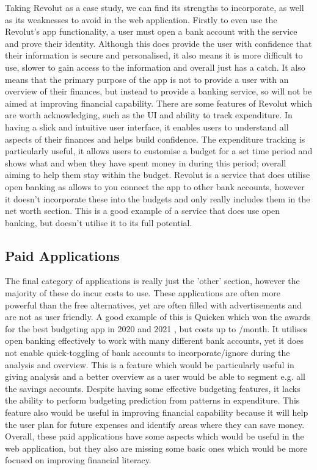 Taking Revolut \cite{RevolutWebsite} as a case study, we can find its strengths to incorporate, as well as its weaknesses to avoid in the web application. Firstly to even use the Revolut's app functionality, a user must open a bank account with the service and prove their identity. Although this does provide the user with confidence that their information is secure and personalised, it also means it is more difficult to use, slower to gain access to the information and overall just has a catch. It also means that the primary purpose of the app is not to provide a user with an overview of their finances, but instead to provide a banking service, so will not be aimed at improving financial capability. There are some features of Revolut which are worth acknowledging, such as the UI and ability to track expenditure. In having a slick and intuitive user interface, it enables users to understand all aspects of their finances and helps build confidence. The expenditure tracking is particularly useful, it allows users to customise a budget for a set time period and shows what and when they have spent money in during this period; overall aiming to help them stay within the budget. Revolut is a service that does utilise open banking as allows to you connect the app to other bank accounts, however it doesn't incorporate these into the budgets and only really includes them in the net worth section. This is a good example of a service that does use open banking, but doesn't utilise it to its full potential.

\subsection{Paid Applications}
\label{sec:paid-applications}
The final category of applications is really just the 'other' section, however the majority of these do incur costs to use. These applications are often more powerful than the free alternatives, yet are often filled with advertisements and are not as user friendly. A good example of this is Quicken which won the awards for the best budgeting app in 2020 and 2021 \cite{Quicken}, but costs up to /month. It utilises open banking effectively to work with many different bank accounts, yet it does not enable quick-toggling of bank accounts to incorporate/ignore during the analysis and overview. This is a feature which would be particularly useful in giving analysis and a better overview as a user would be able to segment e.g. all the savings accounts. Despite having some effective budgeting features, it lacks the ability to perform budgeting prediction from patterns in expenditure. This feature also would be useful in improving financial capability because it will help the user plan for future expenses and identify areas where they can save money. Overall, these paid applications have some aspects which would be useful in the web application, but they also are missing some basic ones which would be more focused on improving financial literacy.

